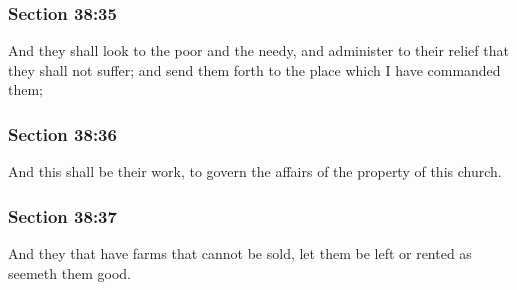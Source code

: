 	\subsubsection{Section 38:35} %
		\label{DC38-35}

		And they shall look to the poor and the needy, and administer to their relief that they shall not suffer; and send them forth to the place which I have commanded them;


	\subsubsection{Section 38:36} %
		\label{DC38-36}

		And this shall be their work, to govern the affairs of the property of this church.


	\subsubsection{Section 38:37} %
		\label{DC38-37}

		And they that have farms that cannot be sold, let them be left or rented as seemeth them good.


